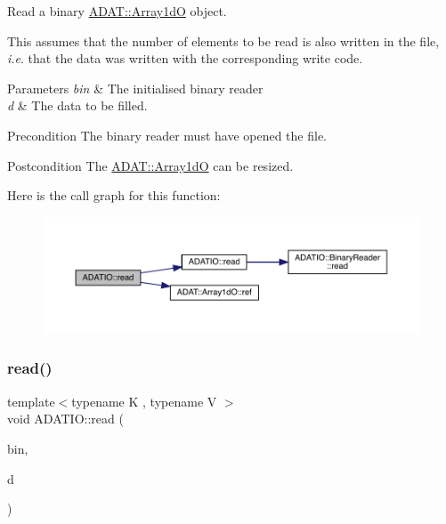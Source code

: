 Read a binary \mbox{\hyperlink{classADAT_1_1Array1dO}{A\+D\+A\+T\+::\+Array1dO}} object. 

This assumes that the number of elements to be read is also written in the file, {\itshape i.\+e}. that the data was written with the corresponding write code. 
\begin{DoxyParams}{Parameters}
{\em bin} & The initialised binary reader \\
\hline
{\em d} & The data to be filled.\\
\hline
\end{DoxyParams}
\begin{DoxyPrecond}{Precondition}
The binary reader must have opened the file. 
\end{DoxyPrecond}
\begin{DoxyPostcond}{Postcondition}
The \mbox{\hyperlink{classADAT_1_1Array1dO}{A\+D\+A\+T\+::\+Array1dO}} can be resized. 
\end{DoxyPostcond}
Here is the call graph for this function\+:
\nopagebreak
\begin{figure}[H]
\begin{center}
\leavevmode
\includegraphics[width=350pt]{d0/dba/namespaceADATIO_aee4123faea4044073f3c166dab12cb9e_cgraph}
\end{center}
\end{figure}
\mbox{\label{namespaceADATIO_aae6ee71c391ad98e959febc86231331b}} 
\subsubsection{\texorpdfstring{read()}{read()}\hspace{0.1cm}{\footnotesize\ttfamily [27/28]}}
{\footnotesize\ttfamily template$<$typename K , typename V $>$ \\
void A\+D\+A\+T\+I\+O\+::read (\begin{DoxyParamCaption}\item[{\mbox{\hyperlink{classADATIO_1_1BinaryReader}{Binary\+Reader}} \&}]{bin,  }\item[{std\+::map$<$ K, V $>$ \&}]{d }\end{DoxyParamCaption})\hspace{0.3cm}{\ttfamily [inline]}}



